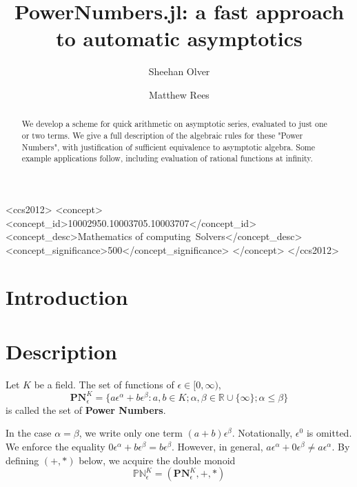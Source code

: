 \documentclass[acmsmall]{acmart}
\begin{document}
	
\title{PowerNumbers.jl: a fast approach to automatic asymptotics}

\author{Sheehan Olver}

\author{Matthew Rees}

\begin{abstract}
	We develop a scheme for quick arithmetic on asymptotic series, evaluated to just one or two terms. We give a full description of the algebraic rules for these "Power Numbers", with justification of sufficient equivalence to asymptotic algebra. Some example applications follow, including evaluation of rational functions at infinity.
\end{abstract}

\begin{CCSXML}
	<ccs2012>
	<concept>
	<concept_id>10002950.10003705.10003707</concept_id>
	<concept_desc>Mathematics of computing~Solvers</concept_desc>
	<concept_significance>500</concept_significance>
	</concept>
	</ccs2012>
\end{CCSXML}



\maketitle

\section{Introduction}

\section{Description}
\begin{definition}
Let $K$ be a field. The set of functions of $\epsilon \in [0,\infty)$,
$$\mathbf{PN}^K_\epsilon = \{a\epsilon^\alpha + b\epsilon^\beta : a,b \in K;\alpha,\beta\in\mathbb{R}\cup\{\infty\}; \alpha\leq\beta\}$$ 
is called the set of \textbf{Power Numbers}. 
\end{definition}
In the case $\alpha=\beta$, we write only one term $(a+b)\epsilon^\beta$. Notationally, $\epsilon^0$ is omitted.
We enforce the equality $0\epsilon^\alpha + b\epsilon^\beta = b\epsilon^\beta$. However, in general, $a\epsilon^\alpha + 0\epsilon^\beta \neq a\epsilon^\alpha$.
By defining $(+,*)$ below, we acquire the double monoid $$\mathbb{PN}^K_\epsilon = (\mathbf{PN}^K_\epsilon,+,*)$$
\end{document}

